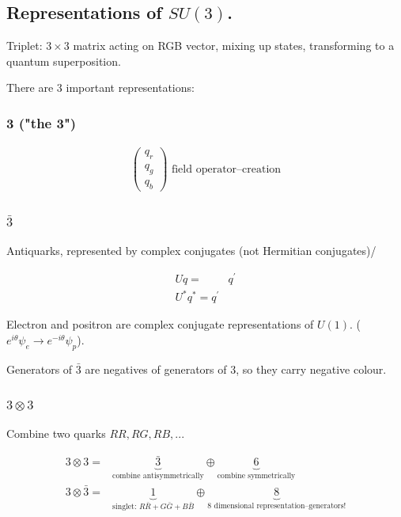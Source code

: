 \documentclass[]{article}
\begin{document}
\subsection{Representations of $SU(3)$.}

Triplet: $3\times3$ matrix acting on RGB vector, mixing up states, transforming to a quantum superposition.

There are 3 important representations:

\subsubsection{3 ("the 3")}

\begin{align*}
	\begin{pmatrix}
		q_r\\
		q_g\\
		q_b
	\end{pmatrix} \text{ field operator--creation}
\end{align*} 

\subsubsection{$\bar{3}$}

Antiquarks, represented by complex conjugates (not Hermitian conjugates)/

\begin{align*}
	U q =& q^\prime\\
	U^* q^* = q^\prime& 
\end{align*}

Electron and positron are complex conjugate representations of $U(1)$. ($e^{i\theta}\psi_e \rightarrow e^{-i\theta}\psi_p$).

Generators of $\bar{3}$ are negatives of generators of $3$, so they carry negative colour.

\subsubsection{$3 \otimes 3$}

Combine two quarks ${RR, RG, RB,...}$

\begin{align*}
	3 \otimes 3 =& \underbrace{\bar{3}}_\text{combine antisymmetrically} \oplus \underbrace{6}_\text{combine symmetrically}\\
	3 \otimes \bar{3} =& \underbrace{1}_\text{singlet: $R\bar{R}+G\bar{G}+B\bar{B}$} \oplus \underbrace{8}_\text{8 dimensional representation--generators!}
\end{align*}
\end{document}
